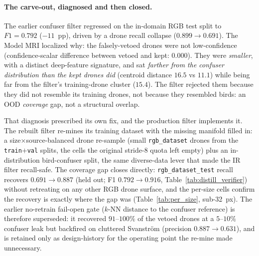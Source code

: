 \paragraph{The carve-out, diagnosed and then closed.}
\label{sec:mlp_recall_drop}
The earlier confuser filter regressed on the in-domain RGB test split to $F1=0.792$ ($-11$~pp), driven by a drone recall collapse ($0.899 \to 0.691$). The Model MRI localized why: the falsely-vetoed drones were not low-confidence (confidence-scalar difference between vetoed and kept: $0.000$). They were \emph{smaller}, with a distinct deep-feature signature, and sat \emph{farther from the confuser distribution than the kept drones did} (centroid distance $16.5$ vs $11.1$) while being far from the filter's training-drone cluster ($15.4$). The filter rejected them because they did not resemble its training drones, not because they resembled birds: an OOD \emph{coverage} gap, not a structural overlap.

That diagnosis prescribed its own fix, and the production filter implements it. The rebuilt filter re-mines its training dataset with the missing manifold filled in: a size$\times$source-balanced drone re-sample (small \texttt{rgb\_dataset} drones from the \texttt{train}$+$\texttt{val} splits, the cells the original stride-8 quota left empty) plus an in-distribution bird-confuser split, the same diverse-data lever that made the IR filter recall-safe. The coverage gap closes directly: \texttt{rgb\_dataset\_test} recall recovers $0.691 \to 0.887$ (held out; F1 $0.792 \to 0.916$, Table~\ref{tab:distill_verifier}) without retreating on any other RGB drone surface, and the per-size cells confirm the recovery is exactly where the gap was (Table~\ref{tab:per_size}, sub-32~px). The earlier no-retrain fail-open gate ($k$-NN distance to the confuser reference) is therefore superseded: it recovered $91$--$100\%$ of the vetoed drones at a $5$--$10\%$ confuser leak but backfired on cluttered Svanstr\"om (precision $0.887 \to 0.631$), and is retained only as design-history for the operating point the re-mine made unnecessary.

